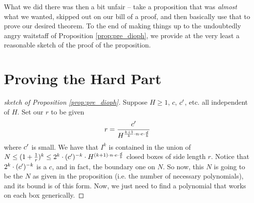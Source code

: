 What we did there was then a bit unfair -- take a proposition that was \emph{almost} what we wanted, skipped out on our bill of a proof, and then basically use that to prove our desired theorem. To the end of making things up to the undoubtedly angry waitstaff of Proposition \ref{prop:pre_dioph}, we provide at the very least a reasonable sketch of the proof of the proposition.

\section{Proving the Hard Part}

\begin{proof}[sketch of Proposition \ref{prop:pre_dioph}]
  Suppose $H \geq 1$, $c$, $c^{\prime}$, etc. all independent of $H$. Set our $r$ to be given
    \begin{align*}
      r = \cfrac{c^{\prime}}{H^{\frac{k + 1}{k} \cdot n \cdot e \cdot \frac{d}{b}}}
    \end{align*}
  where $c^{\prime}$ is small. We have that $I^k$ is contained in the union of $N \leq (1 + \frac{1}{r})^k \leq 2^k \cdot (c^{\prime})^{-k} \cdot H^{(k+1) \cdot n \cdot e \cdot \frac{d}{b}}$ closed boxes of side length $r$. Notice that $2^k \cdot (c^{\prime})^{-k}$ is a $c$, and in fact, the boundary one on $N$. So now, this $N$ is going to be the $N$ as given in the proposition (i.e. the number of necessary polynomials), and its bound is of this form. Now, we just need to find a polynomial that works on each box generically.


\end{proof}

